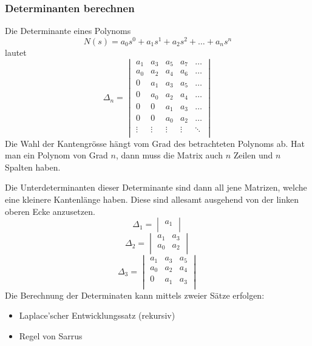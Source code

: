 \subsubsection{Determinanten berechnen}
Die Determinante eines Polynoms 
\[  
    N(s) =  a_0s^0 + a_1s^1 + a_2s^2 + \dots + a_ns^n
\]
lautet
\[ 
    \Delta_n =
       \begin{vmatrix}
            a_1 & a_3 & a_5 & a_7 & \dots \\
            a_0 & a_2 & a_4 & a_6 & \dots \\
            0   & a_1 & a_3 & a_5 & \dots \\
            0   & a_0 & a_2 & a_4 & \dots \\
            0   & 0   & a_1 & a_3 & \dots \\
            0   & 0   & a_0 & a_2 & \dots \\
            \vdots & \vdots & \vdots & \vdots & \ddots \\
        \end{vmatrix}
\]
Die Wahl der Kantengrösse hängt vom Grad des betrachteten Polynoms ab.
Hat man ein Polynom von Grad $n$, dann muss die Matrix auch $n$ Zeilen
und $n$ Spalten haben. 

Die Unterdeterminanten dieser Determinante sind dann all jene Matrizen,
welche eine kleinere Kantenlänge haben. Diese sind allesamt ausgehend
von der linken oberen Ecke anzusetzen.
\[  
    \Delta_1 =
        \begin{vmatrix}
            a_1 \\
        \end{vmatrix}
\]
\[  
    \Delta_2 =
        \begin{vmatrix}
            a_1 & a_3 \\
            a_0 & a_2 \\
        \end{vmatrix}
\]
\[  
    \Delta_3 =
        \begin{vmatrix}
            a_1 & a_3 & a_5 \\
            a_0 & a_2 & a_4 \\
            0   & a_1 & a_3 \\
        \end{vmatrix}
\]
Die Berechnung der Determinaten kann mittels zweier Sätze erfolgen:
\begin{itemize}
    \item Laplace'scher Entwicklungssatz (rekursiv)
    \item Regel von Sarrus
\end{itemize}

